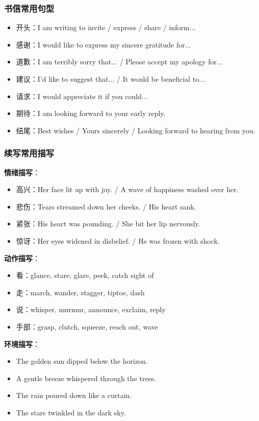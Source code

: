 \subsubsection{书信常用句型}

\begin{itemize}
  \item 开头：I am writing to invite / express / share / inform...
  \item 感谢：I would like to express my sincere gratitude for...
  \item 道歉：I am terribly sorry that... / Please accept my apology for...
  \item 建议：I'd like to suggest that... / It would be beneficial to...
  \item 请求：I would appreciate it if you could...
  \item 期待：I am looking forward to your early reply.
  \item 结尾：Best wishes / Yours sincerely / Looking forward to hearing from you.
\end{itemize}

\subsubsection{续写常用描写}

\textbf{情绪描写}：
\begin{itemize}
  \item 高兴：Her face lit up with joy. / A wave of happiness washed over her.
  \item 悲伤：Tears streamed down her cheeks. / His heart sank.
  \item 紧张：His heart was pounding. / She bit her lip nervously.
  \item 惊讶：Her eyes widened in disbelief. / He was frozen with shock.
\end{itemize}

\textbf{动作描写}：
\begin{itemize}
  \item 看：glance, stare, glare, peek, catch sight of
  \item 走：march, wander, stagger, tiptoe, dash
  \item 说：whisper, murmur, announce, exclaim, reply
  \item 手部：grasp, clutch, squeeze, reach out, wave
\end{itemize}

\textbf{环境描写}：
\begin{itemize}
  \item The golden sun dipped below the horizon.
  \item A gentle breeze whispered through the trees.
  \item The rain poured down like a curtain.
  \item The stars twinkled in the dark sky.
\end{itemize}
